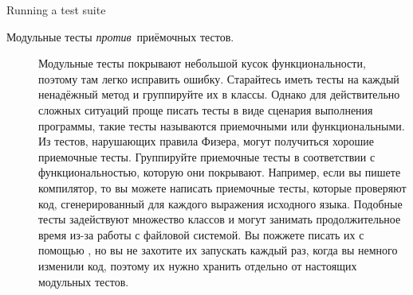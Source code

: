 \documentclass[a4paper,10pt,twoside]{book}
\begin{document}
\begin{method}[testsuiterun]{Running a test suite}
\begin{description}
\item[Модульные тесты \textit{против}\ приёмочных тестов.]
Модульные тесты покрывают небольшой кусок функциональности, поэтому там легко исправить ошибку.
Старайтесь иметь тесты на каждый ненадёжный метод и группируйте их в классы.
Однако для действительно сложных ситуаций проще писать тесты в виде сценария выполнения программы,
такие тесты называются приемочными или функциональными.
Из тестов, нарушающих правила Физера, могут получиться хорошие приемочные тесты.
Группируйте приемочные тесты в соответствии с функциональностью, которую они покрывают.
Например, если вы пишете компилятор, то вы можете написать приемочные тесты,
которые проверяют код, сгенерированный для каждого выражения исходного языка.
Подобные тесты задействуют множество классов и могут занимать продолжительное время
из-за работы с файловой системой. Вы пожжете писать их с помощью \sunit, но вы не захотите их запускать каждый раз,
когда вы немного изменили код, поэтому их нужно хранить отдельно от настоящих модульных тестов. 
 


\end{description}
\end{method}
\end{document}
